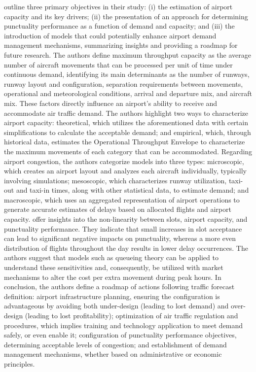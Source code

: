  outline three primary objectives in their study: (i) the estimation of airport capacity and its key drivers; (ii) the presentation of an approach for determining punctuality performance as a function of demand and capacity; and (iii) the introduction of models that could potentially enhance airport demand management mechanisms, summarizing insights and providing a roadmap for future research. The authors define maximum throughput capacity as the average number of aircraft movements that can be processed per unit of time under continuous demand, identifying its main determinants as the number of runways, runway layout and configuration, separation requirements between movements, operational and meteorological conditions, arrival and departure mix, and aircraft mix. These factors directly influence an airport's ability to receive and accommodate air traffic demand. The authors highlight two ways to characterize airport capacity: theoretical, which utilizes the aforementioned data with certain simplifications to calculate the acceptable demand; and empirical, which, through historical data, estimates the Operational Throughput Envelope to characterize the maximum movements of each category that can be accommodated. Regarding airport congestion, the authors categorize models into three types: microscopic, which creates an airport layout and analyzes each aircraft individually, typically involving simulations; mesoscopic, which characterizes runway utilization, taxi-out and taxi-in times, along with other statistical data, to estimate demand; and macroscopic, which uses an aggregated representation of airport operations to generate accurate estimates of delays based on allocated flights and airport capacity.  offer insights into the non-linearity between slots, airport capacity, and punctuality performance. They indicate that small increases in slot acceptance can lead to significant negative impacts on punctuality, whereas a more even distribution of flights throughout the day results in lower delay occurrences. The authors suggest that models such as queueing theory can be applied to understand these sensitivities and, consequently, be utilized with market mechanisms to alter the cost per extra movement during peak hours. In conclusion, the authors define a roadmap of actions following traffic forecast definition: airport infrastructure planning, ensuring the configuration is advantageous by avoiding both under-design (leading to lost demand) and over-design (leading to lost profitability); optimization of air traffic regulation and procedures, which implies training and technology application to meet demand safely, or even enable it; configuration of punctuality performance objectives, determining acceptable levels of congestion; and establishment of demand management mechanisms, whether based on administrative or economic principles.

